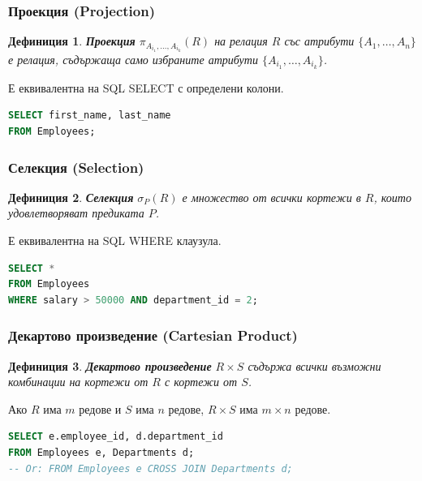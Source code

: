 \documentclass{scrartcl}
\newtheorem{definition}{Дефиниция}
\begin{document}
\begin{FlushLeft}
\subsubsection{Проекция (Projection)}

\begin{definition}
\textbf{\textit{Проекция}} $\pi_{A_{i_1}, \ldots, A_{i_k}}(R)$ на релация $R$ със атрибути $\{A_1, \ldots, A_n\}$ е релация, съдържаща само избраните атрибути $\{A_{i_1}, \ldots, A_{i_k}\}$.
\end{definition}

Е еквивалентна на SQL SELECT с определени колони.

\begin{lstlisting}[language=SQL, caption=Projection (SELECT)]
SELECT first_name, last_name
FROM Employees;
\end{lstlisting}

\subsubsection{Селекция (Selection)}

\begin{definition}
\textbf{\textit{Селекция}} $\sigma_P(R)$ е множество от всички кортежи в $R$, които удовлетворяват предиката $P$.
\end{definition}

Е еквивалентна на SQL WHERE клаузула.

\begin{lstlisting}[language=SQL, caption=Selection (WHERE)]
SELECT *
FROM Employees
WHERE salary > 50000 AND department_id = 2;
\end{lstlisting}

\subsubsection{Декартово произведение (Cartesian Product)}

\begin{definition}
\textbf{\textit{Декартово произведение}} $R \times S$ съдържа всички възможни комбинации на кортежи от $R$ с кортежи от $S$.
\end{definition}

Ако $R$ има $m$ редове и $S$ има $n$ редове, $R \times S$ има $m \times n$ редове.

\begin{lstlisting}[language=SQL, caption=Cartesian product]
SELECT e.employee_id, d.department_id
FROM Employees e, Departments d;
-- Or: FROM Employees e CROSS JOIN Departments d;
\end{lstlisting}


\end{FlushLeft}
\end{document}

